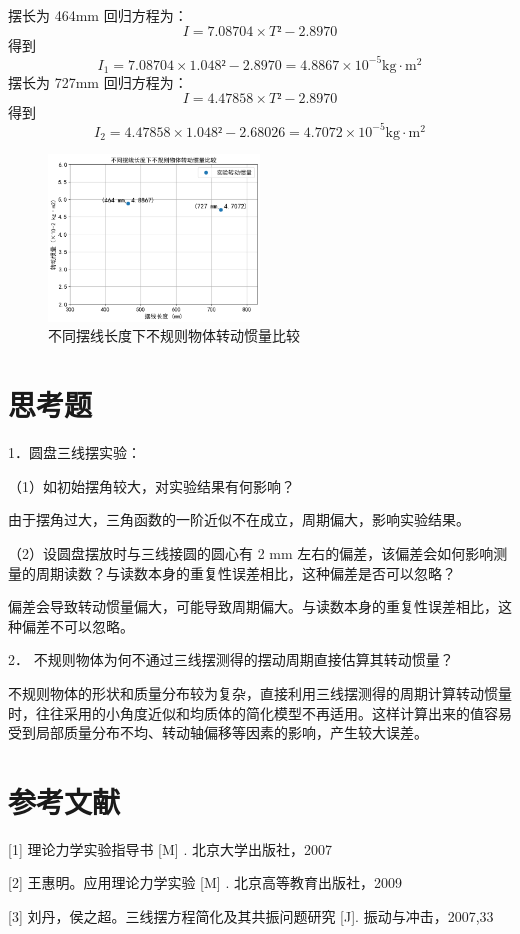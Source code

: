 \documentclass{article}
\begin{document}
摆长为 464mm 回归方程为：
$$
I = 7.08704 \times T²  -2.8970
$$
得到
$$
I_1 = 7.08704 \times 1.048²  -2.8970=4.8867\times  \mathrm{10^{-5}kg \cdot m^2} 
$$
摆长为 727mm 回归方程为：
$$
I = 4.47858 \times T²  -2.8970
$$
得到
$$
I_2 = 4.47858 \times 1.048²  -2.68026=4.7072\times \mathrm{10^{-5}kg \cdot m^2} 
$$

\begin{figure}
    \centering
        \includegraphics[width=0.5\textwidth]{不同摆线长度下不规则物体转动惯量比较.png}
        \caption{不同摆线长度下不规则物体转动惯量比较}
        \label{fig:irregular_data_464}
\end{figure}

\newpage
\section{思考题}
1．圆盘三线摆实验：

（1）如初始摆角较大，对实验结果有何影响？

由于摆角过大，三角函数的一阶近似不在成立，周期偏大，影响实验结果。

（2）设圆盘摆放时与三线接圆的圆心有 2 mm 左右的偏差，该偏差会如何影响测量的周期读数？与读数本身的重复性误差相比，这种偏差是否可以忽略？

偏差会导致转动惯量偏大，可能导致周期偏大。与读数本身的重复性误差相比，这种偏差不可以忽略。


2． 不规则物体为何不通过三线摆测得的摆动周期直接估算其转动惯量？

不规则物体的形状和质量分布较为复杂，直接利用三线摆测得的周期计算转动惯量时，往往采用的小角度近似和均质体的简化模型不再适用。这样计算出来的值容易受到局部质量分布不均、转动轴偏移等因素的影响，产生较大误差。

\section{参考文献}

[1] 理论力学实验指导书 [M] . 北京大学出版社，2007 

[2] 王惠明。应用理论力学实验 [M] . 北京高等教育出版社，2009

[3] 刘丹，侯之超。三线摆方程简化及其共振问题研究 [J]. 振动与冲击，2007,33
\end{document}
